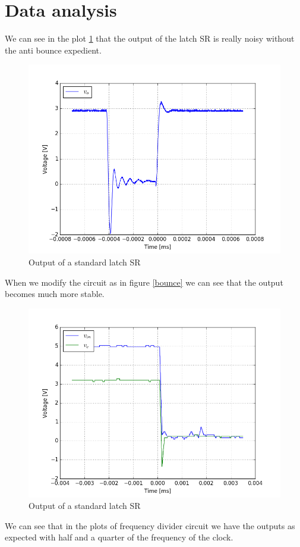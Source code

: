 \section{Data analysis}
We can see in the plot \ref{bounce_time} that the output of the latch SR is really noisy without the anti bounce expedient.
\begin{figure}[H]
\centering
\includegraphics[width=.7\textwidth]{11/bounce_time.png}
\caption{Output of a standard latch SR}\label{bounce_time}
\end{figure}
When we modify the circuit as in figure \ref{bounce} we can see that the output becomes much more stable.
\begin{figure}[H]
\centering
\includegraphics[width=.7\textwidth]{11/anti_bounce_time3.png}
\caption{Output of a standard latch SR}\label{anti_bounce_time3}
\end{figure}
We can see that in the plots of frequency divider circuit we have the outputs as expected with half and a quarter of the frequency of the clock.
